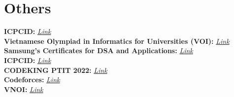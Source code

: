 \documentclass[letterpaper,11pt]{article}
\newcommand{\resumeSubHeadingListStart}{\begin{itemize}[leftmargin=0.15in, label={}]}
\newcommand{\resumeSubHeadingListEnd}{\end{itemize}}
\begin{document}




\section{Others}
  \vspace{2pt}
  \resumeSubHeadingListStart
  \small{\item{
        
  \textbf{ICPCID: }{ \emph{\href{https://icpc.global/ICPCID/DO3D9RLNRDX8}{\color{red}Link}}} \\ \vspace{3pt}
  \textbf{Vietnamese Olympiad in Informatics for Universities (VOI): }{ \emph{\href{https://drive.google.com/file/d/17VevlBhBMuU_wrVzSMOtZyQzstWhlA-Q/view?usp=sharing}{\color{red}Link}}} \\ \vspace{3pt}
  \textbf{Samsung's Certificates for DSA and Applications: }{ \emph{\href{https://drive.google.com/file/d/1kNnWVGgaUS-IkM80B9xVpEJmoQGsRhfZ/view?usp=sharing}{\color{red}Link}}} \\ \vspace{3pt}
  \textbf{ICPCID: }{ \emph{\href{https://icpc.global/ICPCID/DO3D9RLNRDX8}{\color{red}Link}}} \\ \vspace{3pt}
  \textbf{CODEKING PTIT 2022: }{ \emph{\href{https://www.facebook.com/ITPTIT/photos/a.679487585460391/5532805340128567/}{\color{red}Link}}} \\ \vspace{3pt}
  \textbf{Codeforces: }{ \emph{\href{https://codeforces.com/profile/Ignr_h31}{\color{red}Link}}} \\ \vspace{3pt}
  \textbf{VNOI: }{ \emph{\href{https://oj.vnoi.info/user/huys31}{\color{red}Link}}} \\ \vspace{3pt}
}}
  \resumeSubHeadingListEnd



\end{document}
